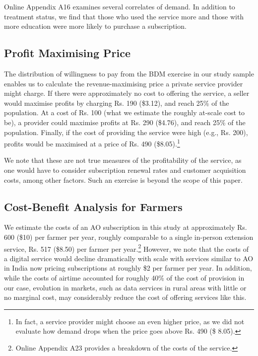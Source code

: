 \documentclass[12pt]{article}
\begin{document}
Online Appendix A16 examines several correlates of demand. In addition to treatment status, we find that those who used the service more and those with more education were more likely to purchase a subscription. 

\subsection{Profit Maximising Price} 

The distribution of willingness to pay from the BDM exercise in our study sample enables us to calculate the revenue-maximising price a private service provider might charge.  If there were approximately no cost to offering the service, a seller would maximise profits by charging Rs. 190 (\$3.12), and reach 25\% of the population. At a cost of Rs. 100 (what we estimate the roughly at-scale cost to be), a provider could maximise profits at Rs. 290 (\$4.76), and reach 25\% of the population. Finally, if the cost of providing the service were high (e.g., Rs. 200), profits would be maximised at a price of Rs. 490 (\$8.05).\footnote{In fact, a service provider might choose an even higher price, as we did not evaluate how demand drops when the price goes above Rs. 490 (\$ 8.05).}

We note that these are not true measures of the profitability of the service, as one would have to consider subscription renewal rates and customer acquisition costs, among other factors. Such an exercise is beyond the scope of this paper. 

\subsection{Cost-Benefit Analysis for Farmers} 

We estimate the costs of an AO subscription in this study at approximately Rs. 600 (\$10) per farmer per year, roughly comparable to a single in-person extension service,  Rs. 517 (\$8.50) per farmer per year.\footnote{Online Appendix A23 provides a breakdown of the costs of the service.} However, we note that the costs of a digital service would decline dramatically with scale with services similar to AO in India now pricing subscriptions at roughly \$2 per farmer per year. In addition, while the costs of airtime accounted for roughly 40\% of the cost of provision in our case, evolution in markets, such as data services in rural areas with little or no marginal cost, may considerably reduce the cost of offering services like this. 
\end{document}
